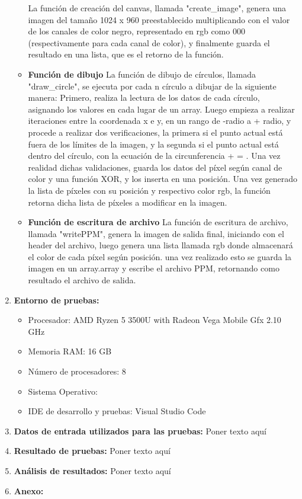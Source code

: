 \documentclass[12pt, letterpaper]{article}
\begin{document}
\begin{flushleft}
\begin{enumerate}
\begin{itemize}
            La función de creación del canvas, llamada "create_image", genera una imagen del tamaño 1024 x 960 preestablecido multiplicando con el valor de los canales de color negro, representado en rgb como 000 (respectivamente para cada canal de color), y finalmente guarda el resultado en una lista, que es el retorno de la función.
            \item \textbf{Función de dibujo}
            La función de dibujo de círculos, llamada "draw_circle", se ejecuta por cada n círculo a dibujar de la siguiente manera: Primero, realiza la lectura de los datos de cada círculo, asignando los valores en cada lugar de un array. Luego empieza a realizar iteraciones entre la coordenada x e y, en un rango de -radio a + radio, y procede a realizar dos verificaciones, la primera si el punto actual está fuera de los límites de la imagen, y la segunda si el punto actual está dentro del círculo, con la ecuación de la circunferencia  +  = . Una vez realidad dichas validaciones, guarda los datos del píxel según canal de color y una función XOR, y los inserta en una posición. Una vez generado la lista de píxeles con su posición y respectivo color rgb, la función retorna dicha lista de píxeles a modificar en la imagen.
            \item \textbf{Función de escritura de archivo}
            La función de escritura de archivo, llamada "writePPM", genera la imagen de salida final, iniciando con el header del archivo, luego genera una lista llamada rgb donde almacenará el color de cada píxel según posición. una vez realizado esto se guarda la imagen en un array.array y escribe el archivo PPM, retornando como resultado el archivo de salida.
        \end{itemize}

        \vspace{10mm}
        \item \textbf{Entorno de pruebas:}
            \begin{itemize}
                \item Procesador: AMD Ryzen 5 3500U with Radeon Vega Mobile Gfx  2.10 GHz
                \item Memoria RAM: 16 GB
                \item Número de procesadores: 8
                \item Sistema Operativo: 
                \item IDE de desarrollo y pruebas: Visual Studio Code
            \end{itemize}
        \item \textbf{Datos de entrada utilizados para las pruebas:}
        Poner texto aquí
        \item \textbf{Resultado de pruebas:}
        Poner texto aquí
        \item \textbf{Análisis de resultados:}
        Poner texto aquí
        \item \textbf{Anexo:}
    \end{enumerate}
\end{flushleft}
\end{document}
